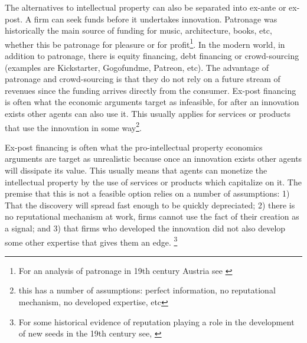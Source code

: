 The alternatives to intellectual property can also be separated into ex-ante or ex-post. A firm can seek funds before it undertakes innovation. Patronage was historically the main source of funding for music, architecture, books, etc, whether this be patronage for pleasure or for profit\footnote{For an analysis of patronage in 19th century Austria see \cite{carletti2013top} }. In the modern world, in addition to patronage, there is equity financing, debt financing or crowd-sourcing (examples are Kickstarter, Gogofundme, Patreon, etc). The advantage of patronage and crowd-sourcing is that they do not rely on a future stream of revenues since the funding arrives directly from the consumer. Ex-post financing is often what the economic arguments target as infeasible, for after an innovation exists other agents can also use it. This usually applies for services or products that use the innovation in some way\footnote{ this has a number of assumptions: perfect information, no reputational mechanism, no developed expertise, etc }.


Ex-post financing is often what the pro-intellectual property economics arguments are target as unrealistic because once an innovation exists other agents will dissipate its value. This usually means that agents can monetize the intellectual property by the use of services or products which capitalize on it. The premise that this is not a feasible option relies on a number of assumptions: 1) That the discovery will spread fast enough to be quickly depreciated; 2) there is no reputational mechanism at work, firms cannot use the fact of their creation as a signal; and 3) that firms who developed the innovation did not also develop some other expertise that gives them an edge. \footnote{For some historical evidence of reputation playing a role in the development of new seeds in the 19th century see, \cite{charnley2013seeds}}






